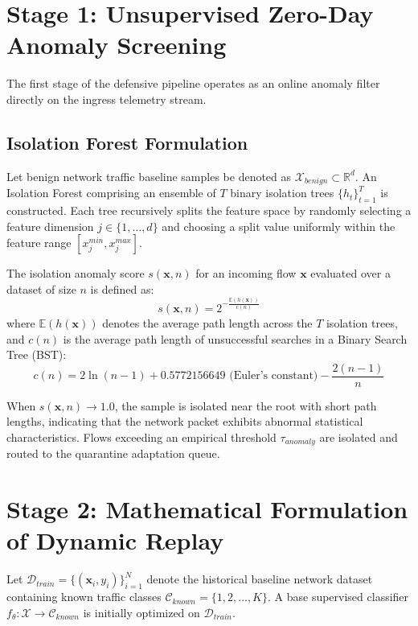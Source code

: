 \section{Stage 1: Unsupervised Zero-Day Anomaly Screening}
The first stage of the defensive pipeline operates as an online anomaly filter directly on the ingress telemetry stream.

\subsection{Isolation Forest Formulation}
Let benign network traffic baseline samples be denoted as $\mathcal{X}_{benign} \subset \mathbb{R}^d$. An Isolation Forest comprising an ensemble of $T$ binary isolation trees $\{h_t\}_{t=1}^{T}$ is constructed. Each tree recursively splits the feature space by randomly selecting a feature dimension $j \in \{1, \dots, d\}$ and choosing a split value uniformly within the feature range $[x_{j}^{min}, x_{j}^{max}]$.

The isolation anomaly score $s(\mathbf{x}, n)$ for an incoming flow $\mathbf{x}$ evaluated over a dataset of size $n$ is defined as:
\begin{equation}
s(\mathbf{x}, n) = 2^{-\frac{\mathbb{E}(h(\mathbf{x}))}{c(n)}}
\end{equation}
where $\mathbb{E}(h(\mathbf{x}))$ denotes the average path length across the $T$ isolation trees, and $c(n)$ is the average path length of unsuccessful searches in a Binary Search Tree (BST):
\begin{equation}
c(n) = 2 \ln(n - 1) + 0.5772156649 \text{ (Euler's constant)} - \frac{2(n - 1)}{n}
\end{equation}

When $s(\mathbf{x}, n) \rightarrow 1.0$, the sample is isolated near the root with short path lengths, indicating that the network packet exhibits abnormal statistical characteristics. Flows exceeding an empirical threshold $\tau_{anomaly}$ are isolated and routed to the quarantine adaptation queue.

\section{Stage 2: Mathematical Formulation of Dynamic Replay}
Let $\mathcal{D}_{train} = \{(\mathbf{x}_i, y_i)\}_{i=1}^{N}$ denote the historical baseline network dataset containing known traffic classes $\mathcal{C}_{known} = \{1, 2, \dots, K\}$. A base supervised classifier $f_{\theta}: \mathcal{X} \rightarrow \mathcal{C}_{known}$ is initially optimized on $\mathcal{D}_{train}$.

